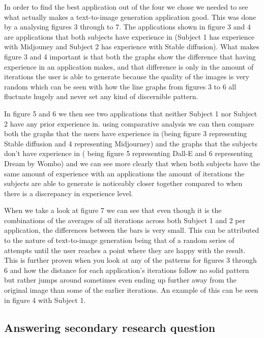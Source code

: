 \documentclass[]{report}
\begin{document}
	In order to find the best application out of the four we chose we needed to see what actually makes a text-to-image generation application good. This was done by a analysing figures 3 through to 7. The applications shown in figure 3 and 4 are applications that both subjects have experience in (Subject 1 has experience with Midjouney and Subject 2 has experience with Stable diffusion). What makes figure 3 and 4 important is that both the graphs show the difference that having experience in an application makes, and that difference is only in the amount of iterations the user is able to generate because the quality of the images is very random which can be seen with how the line graphs from figures 3 to 6 all fluctuate hugely and never set any kind of discernible pattern. 
	

	
	In figure 5 and 6 we then see two applications that neither Subject 1 nor Subject 2 have any prior experience in. using comparative analysis we can then compare both the graphs that the users have experience in (being figure 3 representing Stable diffusion and 4 representing Midjourney) and the graphs that the subjects don't have experience in ( being figure 5 representing Dall-E and 6 representing Dream by Wombo) and we can see more clearly that when both subjects have the same amount of experience with an applications the amount of iterations the subjects are able to generate is noticeably closer together compared to when there is a discrepancy in experience level. 
	

	
	When we take a look at figure 7 we can see that even though it is the combinations of the averages of all iterations across both Subject 1 and 2 per application, the differences between the bars is very small. This can be attributed to the nature of text-to-image generation being that of a random series of attempts until the user reaches a point where they are happy with the result. This is further proven when you look at any of the patterns for figures 3 through 6 and how the distance for each application's iterations follow no solid pattern but rather jumps around sometimes even ending up further away from the original image than some of the earlier iterations. An example of this can be seen in figure 4 with Subject 1.
	
	
	\subsection{Answering secondary research question}
	
\end{document}

